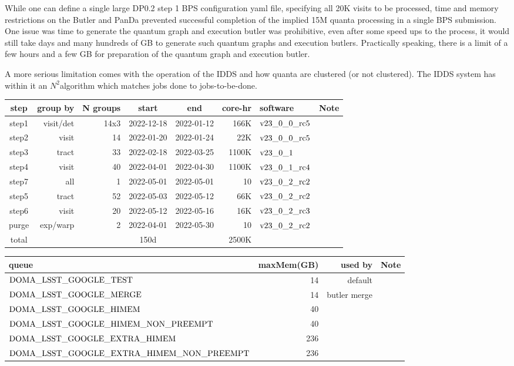 \documentclass[OPS,authoryear,toc]{lsstdoc}
\begin{document}
While one can define a single large DP0.2 step 1 BPS configuration yaml file,
specifying all 20K visits to be processed, time and memory restrictions
on the Butler and PanDa prevented successful completion of the implied 
15M quanta processing in a single BPS submission.
One issue was time to generate the quantum graph and execution butler was
prohibitive, even after some speed ups to the process, it would still take
days and many hundreds of GB to generate such quantum graphs and execution
butlers.  Practically speaking, there is a limit of a few hours and a few GB
for preparation of the quantum graph and execution butler.  

A more serious limitation comes with the operation of the IDDS and how
quanta are clustered (or not clustered).  The IDDS system has within it an $N^2$algorithm which matches jobs done to jobs-to-be-done.


\begin{center}
\begin{tabular} { |c|r|r|c|c|r|l|l|}
\hline
step & group by & N groups & start & end & core-hr & software & Note\\
\hline
step1 & visit/det & 14x3 &2022-12-18& 2022-01-12 & 166K & $\rm v23\_0\_0\_rc5$ &\\
step2 & visit  & 14 & 2022-01-20& 2022-01-24 & 22K & $\rm v23\_0\_0\_rc5$ &\\
step3 & tract & 33 & 2022-02-18& 2022-03-25 & 1100K & $\rm v23\_0\_1$ &\\
step4 & visit & 40& 2022-04-01& 2022-04-30 & 1100K & $\rm v23\_0\_1\_rc4$ &\\
step7 & all & 1 & 2022-05-01& 2022-05-01 & 10 & $\rm v23\_0\_2\_rc2$ &\\
step5 & tract & 52 & 2022-05-03& 2022-05-12 & 66K & $\rm v23\_0\_2\_rc2$ &\\
step6 & visit & 20&2022-05-12& 2022-05-16 & 16K & $\rm v23\_0\_2\_rc3$ &\\
purge & exp/warp & 2 & 2022-04-01& 2022-05-30 & 10 & $\rm v23\_0\_2\_rc2$ & \\
\hline
total & & & 150d & & 2500K &&\\
\hline
\end{tabular}
\end{center}


\begin{center}
\begin{tabular} { |l|r|r|l|}
\hline
queue & maxMem(GB) & used by &  Note\\
\hline
$\rm DOMA\_LSST\_GOOGLE\_TEST$ & 14 & default &\\
$\rm DOMA\_LSST\_GOOGLE\_MERGE$ & 14 & butler merge &\\
$\rm DOMA\_LSST\_GOOGLE\_HIMEM$ & 40 &  &\\
$\rm DOMA\_LSST\_GOOGLE\_HIMEM\_NON\_PREEMPT$ & 40 & &\\
$\rm DOMA\_LSST\_GOOGLE\_EXTRA\_HIMEM$ & 236 &  &\\
$\rm DOMA\_LSST\_GOOGLE\_EXTRA\_HIMEM\_NON\_PREEMPT$ & 236 & &\\
\hline
\end{tabular}
\end{center}
\end{document}

